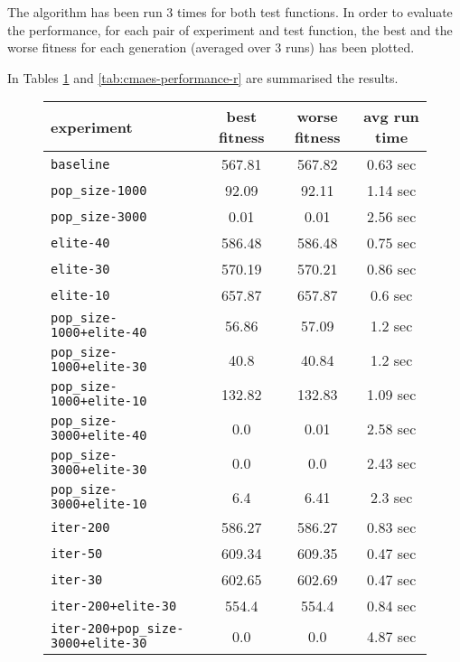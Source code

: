 The algorithm has been run 3 times for both test functions. 
In order to evaluate the performance, for each pair of experiment and test function, the best and the worse fitness for each generation (averaged over 3 runs) has been plotted. 

In Tables \ref{tab:cmaes-performance-s} and \ref{tab:cmaes-performance-r} are summarised the results. 

\begin{figure}[htb]
	\centering
	
	\begin{tabular}{lccc}
		\toprule
		\textbf{experiment} & \textbf{best fitness} & \textbf{worse fitness} & \textbf{avg run time} \\
		\midrule
		\texttt{baseline 						}		&	567.81 &	 567.82 &	  0.63 sec \\
		\texttt{pop\_size-1000 					}		  &	 92.09 &	  92.11 &	  1.14 sec \\
		\texttt{pop\_size-3000 					}		  &	  0.01 &	   0.01 &	  2.56 sec \\
		\texttt{elite-40 						}		&	586.48 &	 586.48 &	  0.75 sec \\
		\texttt{elite-30 						}		&	570.19 &	 570.21 &	  0.86 sec \\
		\texttt{elite-10 						}		&	657.87 &	 657.87 &	   0.6 sec \\
		\texttt{pop\_size-1000+elite-40 		}	 &	 56.86 &	  57.09 &	   1.2 sec \\
		\texttt{pop\_size-1000+elite-30 		}	 &	  40.8 &	  40.84 &	   1.2 sec \\
		\texttt{pop\_size-1000+elite-10 		}	 &	132.82 &	 132.83 &	  1.09 sec \\
		\texttt{pop\_size-3000+elite-40 		}	 &	   0.0 &	   0.01 &	  2.58 sec \\
		\texttt{pop\_size-3000+elite-30 		}	 &	   0.0 &	    0.0 &	  2.43 sec \\
		\texttt{pop\_size-3000+elite-10 		}	 &	   6.4 &	   6.41 &	   2.3 sec \\
		\texttt{iter-200 						}		&	586.27 &	 586.27 &	  0.83 sec \\
		\texttt{iter-50 						}		 &	609.34 &	 609.35 &	  0.47 sec \\
		\texttt{iter-30 						}		 &	602.65 &	 602.69 &	  0.47 sec \\
		\texttt{iter-200+elite-30 				}	&	 554.4 &	  554.4 &	  0.84 sec \\
		\texttt{iter-200+pop\_size-3000+elite-30} 	 &	   0.0 &	    0.0 &	  4.87 sec \\
		
		\bottomrule
	\end{tabular}
	\label{tab:cmaes-performance-s}
\end{figure}

